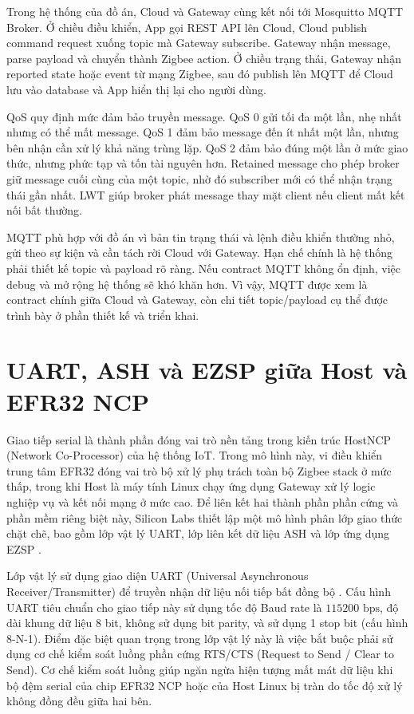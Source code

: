 Trong hệ thống của đồ án, Cloud và Gateway cùng kết nối tới Mosquitto MQTT Broker. Ở chiều điều khiển, App gọi REST API lên Cloud, Cloud publish command request xuống topic mà Gateway subscribe. Gateway nhận message, parse payload và chuyển thành Zigbee action. Ở chiều trạng thái, Gateway nhận reported state hoặc event từ mạng Zigbee, sau đó publish lên MQTT để Cloud lưu vào database và App hiển thị lại cho người dùng.

QoS quy định mức đảm bảo truyền message. QoS 0 gửi tối đa một lần, nhẹ nhất nhưng có thể mất message. QoS 1 đảm bảo message đến ít nhất một lần, nhưng bên nhận cần xử lý khả năng trùng lặp. QoS 2 đảm bảo đúng một lần ở mức giao thức, nhưng phức tạp và tốn tài nguyên hơn. Retained message cho phép broker giữ message cuối cùng của một topic, nhờ đó subscriber mới có thể nhận trạng thái gần nhất. LWT giúp broker phát message thay mặt client nếu client mất kết nối bất thường.

MQTT phù hợp với đồ án vì bản tin trạng thái và lệnh điều khiển thường nhỏ, gửi theo sự kiện và cần tách rời Cloud với Gateway. Hạn chế chính là hệ thống phải thiết kế topic và payload rõ ràng. Nếu contract MQTT không ổn định, việc debug và mở rộng hệ thống sẽ khó khăn hơn. Vì vậy, MQTT được xem là contract chính giữa Cloud và Gateway, còn chi tiết topic/payload cụ thể được trình bày ở phần thiết kế và triển khai.

\section{UART, ASH và EZSP giữa Host và EFR32 NCP}
\label{sec:ch2-uart-ash-ezsp}

Giao tiếp serial là thành phần đóng vai trò nền tảng trong kiến trúc Host\textendash{}NCP (Network Co-Processor) của hệ thống IoT. Trong mô hình này, vi điều khiển trung tâm EFR32 đóng vai trò bộ xử lý phụ trách toàn bộ Zigbee stack ở mức thấp, trong khi Host là máy tính Linux chạy ứng dụng Gateway xử lý logic nghiệp vụ và kết nối mạng ở mức cao. Để liên kết hai thành phần phần cứng và phần mềm riêng biệt này, Silicon Labs thiết lập một mô hình phân lớp giao thức chặt chẽ, bao gồm lớp vật lý UART, lớp liên kết dữ liệu ASH và lớp ứng dụng EZSP \cite{silabs-ezsp,silabs-z3gateway}.

Lớp vật lý sử dụng giao diện UART (Universal Asynchronous Receiver/Transmitter) để truyền nhận dữ liệu nối tiếp bất đồng bộ \cite{uart-adi}. Cấu hình UART tiêu chuẩn cho giao tiếp này sử dụng tốc độ Baud rate là $115200\text{ bps}$, độ dài khung dữ liệu 8 bit, không sử dụng bit parity, và sử dụng 1 stop bit (cấu hình 8-N-1). Điểm đặc biệt quan trọng trong lớp vật lý này là việc bắt buộc phải sử dụng cơ chế kiểm soát luồng phần cứng RTS/CTS (Request to Send / Clear to Send). Cơ chế kiểm soát luồng giúp ngăn ngừa hiện tượng mất mát dữ liệu khi bộ đệm serial của chip EFR32 NCP hoặc của Host Linux bị tràn do tốc độ xử lý không đồng đều giữa hai bên.

